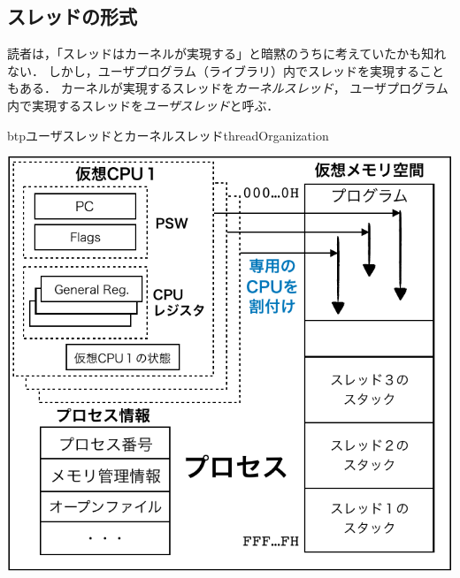 \subsection{スレッドの形式}
読者は，「スレッドはカーネルが実現する」と暗黙のうちに考えていたかも知れない．
しかし，ユーザプログラム（ライブラリ）内でスレッドを実現することもある．
カーネルが実現するスレッドを\emph{カーネルスレッド}，
ユーザプログラム内で実現するスレッドを\emph{ユーザスレッド}と呼ぶ．

\begin{myfig}{btp}{ユーザスレッドとカーネルスレッド}{threadOrganization}
  \begin{minipage}{0.49\columnwidth}
    \begin{center}
      \includegraphics[scale=0.6]{Fig/kernelThread-crop.pdf}
      \label{fig:kernelThread}
    \end{center}
  \end{minipage}
  \begin{minipage}{0.49\columnwidth}
    \begin{center}

\end{center}
\end{minipage}
\end{myfig}
